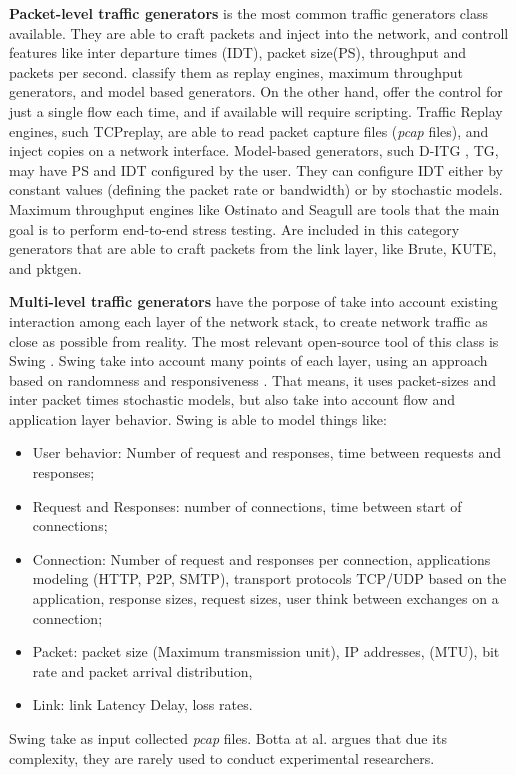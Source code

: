 \textbf{Packet-level traffic generators} is the most common  traffic generators class available. They are able to craft packets and inject into the network, and controll features like inter departure times (IDT), packet size(PS), throughput and packets per second\cite{validate-trafficgen}. \cite{validate-trafficgen} classify them as replay engines, maximum throughput generators, and model based generators. On the other hand, offer the control for just a single flow each time, and if available will require scripting. Traffic Replay engines, such TCPreplay\cite{web-tcpreplay}, are  able to read packet capture files (\textit{pcap} files), and inject copies on a network interface. Model-based generators, such D-ITG \cite{ditg-paper}, TG\cite{web-tg}, may have PS and IDT configured by the user. They can configure IDT  either by constant values (defining the packet rate or bandwidth) or by stochastic models. Maximum throughput engines like Ostinato and Seagull are tools that the main goal is to perform end-to-end stress testing. Are included in this category generators that are able to craft packets from the link layer, like Brute, KUTE, and pktgen.

\textbf{Multi-level traffic generators} have the porpose of  take into account existing interaction among each layer of the network stack, to create network traffic as close as possible from reality. The most relevant open-source  tool of this class is Swing \cite{swing-paper}. Swing take into account many points of each layer, using an approach based on randomness and responsiveness \cite{swing-paper}. That means, it uses packet-sizes and inter packet times stochastic models, but also take into account flow and application layer behavior. Swing is able to model things like\cite{swing-paper}: 
\begin{itemize}
	\item User behavior: Number of request and responses, time between requests and responses;
	\item Request and Responses: number of connections, time between start of connections;
	\item Connection: Number of request and responses per connection, applications modeling (HTTP, P2P, SMTP), transport protocols TCP/UDP based on the application, response sizes, request sizes, user think between exchanges on a connection;
	\item Packet: packet size (Maximum transmission unit), IP addresses, (MTU), bit rate and packet arrival distribution, 
	\item Link: link Latency Delay, loss rates.
\end{itemize}
Swing take as input collected \textit{pcap} files. Botta at al. \cite{do-you-trust} argues that due its complexity, they are rarely used to conduct experimental researchers. 


